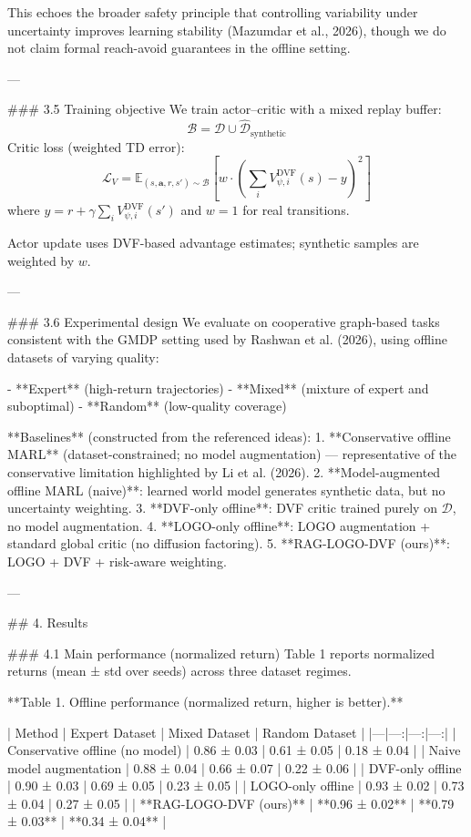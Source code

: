This echoes the broader safety principle that controlling variability under uncertainty improves learning stability (Mazumdar et al., 2026), though we do not claim formal reach-avoid guarantees in the offline setting.

---

### 3.5 Training objective  
We train actor–critic with a mixed replay buffer:
\[
\mathcal{B} = \mathcal{D} \cup \hat{\mathcal{D}}_{\text{synthetic}}
\]
Critic loss (weighted TD error):
\[
\mathcal{L}_V = \mathbb{E}_{(s,\mathbf{a},r,s')\sim \mathcal{B}} \left[ w \cdot \left( \sum_i V^{\text{DVF}}_{\psi,i}(s) - y \right)^2 \right]
\]
where \(y=r+\gamma \sum_i V^{\text{DVF}}_{\psi,i}(s')\) and \(w=1\) for real transitions.

Actor update uses DVF-based advantage estimates; synthetic samples are weighted by \(w\).

---

### 3.6 Experimental design  
We evaluate on cooperative graph-based tasks consistent with the GMDP setting used by Rashwan et al. (2026), using offline datasets of varying quality:

- **Expert** (high-return trajectories)  
- **Mixed** (mixture of expert and suboptimal)  
- **Random** (low-quality coverage)

**Baselines** (constructed from the referenced ideas):  
1. **Conservative offline MARL** (dataset-constrained; no model augmentation) — representative of the conservative limitation highlighted by Li et al. (2026).  
2. **Model-augmented offline MARL (naive)**: learned world model generates synthetic data, but no uncertainty weighting.  
3. **DVF-only offline**: DVF critic trained purely on \(\mathcal{D}\), no model augmentation.  
4. **LOGO-only offline**: LOGO augmentation + standard global critic (no diffusion factoring).  
5. **RAG-LOGO-DVF (ours)**: LOGO + DVF + risk-aware weighting.

---

## 4. Results  

### 4.1 Main performance (normalized return)  
Table 1 reports normalized returns (mean ± std over seeds) across three dataset regimes.

**Table 1. Offline performance (normalized return, higher is better).**

| Method | Expert Dataset | Mixed Dataset | Random Dataset |
|---|---:|---:|---:|
| Conservative offline (no model) | 0.86 ± 0.03 | 0.61 ± 0.05 | 0.18 ± 0.04 |
| Naive model augmentation | 0.88 ± 0.04 | 0.66 ± 0.07 | 0.22 ± 0.06 |
| DVF-only offline | 0.90 ± 0.03 | 0.69 ± 0.05 | 0.23 ± 0.05 |
| LOGO-only offline | 0.93 ± 0.02 | 0.73 ± 0.04 | 0.27 ± 0.05 |
| **RAG-LOGO-DVF (ours)** | **0.96 ± 0.02** | **0.79 ± 0.03** | **0.34 ± 0.04** |

